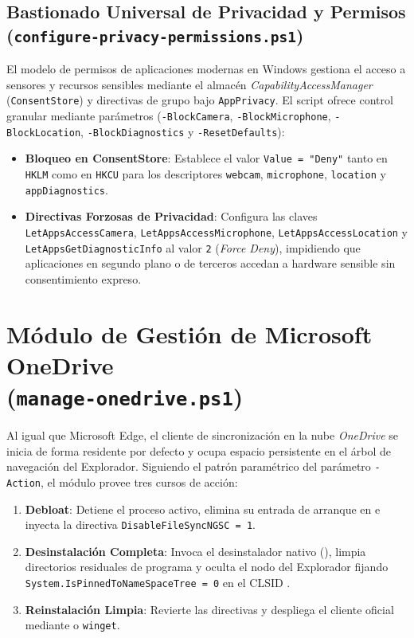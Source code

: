 \documentclass[12pt,a4paper]{report}
\begin{document}
\subsection{Bastionado Universal de Privacidad y Permisos (\texttt{configure-privacy-permissions.ps1})}
El modelo de permisos de aplicaciones modernas en Windows gestiona el acceso a sensores y recursos sensibles mediante el almacén \textit{CapabilityAccessManager} (\texttt{ConsentStore}) y directivas de grupo bajo \texttt{AppPrivacy}. El script ofrece control granular mediante parámetros (\texttt{-BlockCamera}, \texttt{-BlockMicrophone}, \texttt{-BlockLocation}, \texttt{-BlockDiagnostics} y \texttt{-ResetDefaults}):
\begin{itemize}
    \item \textbf{Bloqueo en ConsentStore}: Establece el valor \texttt{Value = "Deny"} tanto en \texttt{HKLM} como en \texttt{HKCU} para los descriptores \texttt{webcam}, \texttt{microphone}, \texttt{location} y \texttt{appDiagnostics}.
    \item \textbf{Directivas Forzosas de Privacidad}: Configura las claves \texttt{LetAppsAccessCamera}, \texttt{LetAppsAccessMicrophone}, \texttt{LetAppsAccessLocation} y \texttt{LetAppsGetDiagnosticInfo} al valor \texttt{2} (\textit{Force Deny}), impidiendo que aplicaciones en segundo plano o de terceros accedan a hardware sensible sin consentimiento expreso.
\end{itemize}

\section[Módulo de Gestión de OneDrive]{Módulo de Gestión de Microsoft OneDrive\\ \large(\texttt{manage-onedrive.ps1})}
Al igual que Microsoft Edge, el cliente de sincronización en la nube \textit{OneDrive} se inicia de forma residente por defecto y ocupa espacio persistente en el árbol de navegación del Explorador. Siguiendo el patrón paramétrico del parámetro \texttt{-Action}, el módulo provee tres cursos de acción:
\begin{enumerate}
    \item \textbf{Debloat}: Detiene el proceso activo, elimina su entrada de arranque en  e inyecta la directiva \texttt{DisableFileSyncNGSC = 1}.
    \item \textbf{Desinstalación Completa}: Invoca el desinstalador nativo (), limpia directorios residuales de programa y oculta el nodo del Explorador fijando \texttt{System.IsPinnedToNameSpaceTree = 0} en el CLSID .
    \item \textbf{Reinstalación Limpia}: Revierte las directivas y despliega el cliente oficial mediante  o \texttt{winget}.
\end{enumerate}
\end{document}
